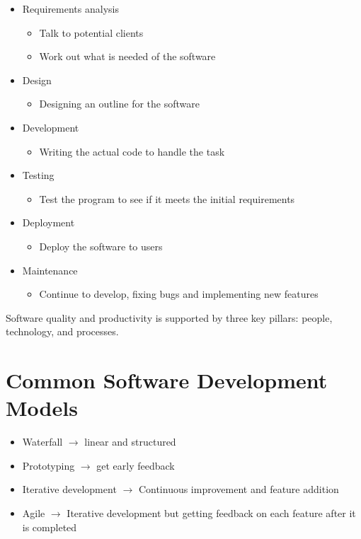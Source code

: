 \documentclass{report}
\begin{document}
			\begin{itemize}
				\item Requirements analysis
					\begin{itemize}
						\item Talk to potential clients
						\item Work out what is needed of the software
					\end{itemize}
				\item Design
					\begin{itemize}
						\item Designing an outline for the software
					\end{itemize}
				\item Development
					\begin{itemize}
						\item Writing the actual code to handle the task
					\end{itemize}
				\item Testing
					\begin{itemize}
						\item Test the program to see if it meets the initial requirements
					\end{itemize}
				\item Deployment
					\begin{itemize}
						\item Deploy the software to users
					\end{itemize}
				\item Maintenance
					\begin{itemize}
						\item Continue to develop, fixing bugs and implementing new features
					\end{itemize}
			\end{itemize}
		
		Software quality and productivity is supported by three key pillars: people, technology, and processes. 

	\section{Common Software Development Models}

		\begin{itemize}
			\item Waterfall $\rightarrow$ linear and structured
			\item Prototyping $\rightarrow$ get early feedback
			\item Iterative development $\rightarrow$ Continuous improvement and feature addition
			\item Agile $\rightarrow$ Iterative development but getting feedback on each feature after it is completed
		\end{itemize}
\end{document}
